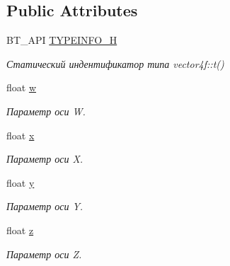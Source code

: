\subsection*{Public Attributes}
\begin{DoxyCompactItemize}
\item 
\hypertarget{classbt_1_1vector4f_a4bb128e24f083d20e7514104c306b0aa}{B\-T\-\_\-\-A\-P\-I \hyperlink{classbt_1_1vector4f_a4bb128e24f083d20e7514104c306b0aa}{T\-Y\-P\-E\-I\-N\-F\-O\-\_\-\-H}}\label{classbt_1_1vector4f_a4bb128e24f083d20e7514104c306b0aa}

\begin{DoxyCompactList}\small\item\em Статический индентификатор типа vector4f\-::t() \end{DoxyCompactList}\item 
\hypertarget{classbt_1_1vector4f_a560f53b3f304ffe3f4d82ab27710abd8}{float \hyperlink{classbt_1_1vector4f_a560f53b3f304ffe3f4d82ab27710abd8}{w}}\label{classbt_1_1vector4f_a560f53b3f304ffe3f4d82ab27710abd8}

\begin{DoxyCompactList}\small\item\em Параметр оси W. \end{DoxyCompactList}\item 
\hypertarget{classbt_1_1vector4f_a40fd0f538fe23558cde80db65cb5e913}{float \hyperlink{classbt_1_1vector4f_a40fd0f538fe23558cde80db65cb5e913}{x}}\label{classbt_1_1vector4f_a40fd0f538fe23558cde80db65cb5e913}

\begin{DoxyCompactList}\small\item\em Параметр оси X. \end{DoxyCompactList}\item 
\hypertarget{classbt_1_1vector4f_aad173480b901b6a749b6da30960cdc3b}{float \hyperlink{classbt_1_1vector4f_aad173480b901b6a749b6da30960cdc3b}{y}}\label{classbt_1_1vector4f_aad173480b901b6a749b6da30960cdc3b}

\begin{DoxyCompactList}\small\item\em Параметр оси Y. \end{DoxyCompactList}\item 
\hypertarget{classbt_1_1vector4f_aca1c06380e60c3413d2b79176c9b724d}{float \hyperlink{classbt_1_1vector4f_aca1c06380e60c3413d2b79176c9b724d}{z}}\label{classbt_1_1vector4f_aca1c06380e60c3413d2b79176c9b724d}

\begin{DoxyCompactList}\small\item\em Параметр оси Z. \end{DoxyCompactList}\end{DoxyCompactItemize}
